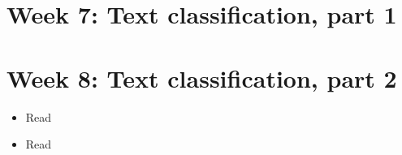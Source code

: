 \section*{Week 7: Text classification, part 1}
\begin{itemize}
	\item{Watch: \url{https://www.youtube.com/watch?v=81vTqTz2pbM}
	\item{Read \cite{van_zoonen_social_2016}}
\end{itemize}


\section*{Week 8: Text classification, part 2}
\begin{itemize}
	\item{Read \cite{jordan_machine_2015}}
	\item{Read \cite{meppelink_reliable_2021}}
\end{itemize}



